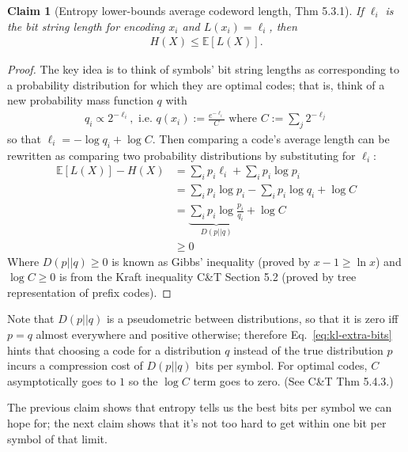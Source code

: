 \documentclass{article}
\newtheorem{claim}{Claim}
\newcommand{\E}{\mathbb{E}}
\begin{document}
    \begin{claim}[Entropy lower-bounds average codeword length, Thm 5.3.1]
         If $\ell_i$ is the bit string length for encoding $x_i$ and $L(x_i) =
         \ell_i$, then
        \begin{align}
            H(X) \leq \E[L(X)].
        \end{align}
    \end{claim}
    \begin{proof}
        The key idea is to think of symbols' bit string lengths as
        corresponding to a probability distribution for which they are optimal
        codes; that is, think of a new probability mass function $q$ with
        \begin{align}
            q_i \propto 2^{-\ell_i}, \text{~i.e.~} q(x_i) :=
            \frac{e^{-\ell_i}}{C} \text{~where~} C := \sum_j 2^{-\ell_j}
        \end{align}
        so that $\ell_i = -\log q_i + \log C$. Then comparing a code's average
        length can be rewritten as comparing two probability distributions by
        substituting for $\ell_i$:
        \begin{align}
            \E[L(X)] - H(X) &= \sum_i p_i \ell_i + \sum_i p_i \log p_i \label{eq:expected-length} \\
            &= \sum_i p_i \log p_i - \sum_i p_i \log q_i + \log C \label{eq:length-and-predictive} \\
            &= \underbrace{\sum_i p_i \log \frac{p_i}{q_i}}_{D(p || q)} +  \log C \label{eq:kl-extra-bits} \\
            &\geq 0
        \end{align}
        Where $D(p||q) \geq 0$ is known as Gibbs' inequality (proved by $x-1
        \geq \ln x$) and $\log C \geq 0$ is from the Kraft inequality
        C\&T Section 5.2 (proved by tree representation of prefix codes).
    \end{proof}

    Note that $D(p||q)$ is a pseudometric between distributions, so that it is
    zero iff $p=q$ almost everywhere and positive otherwise; therefore
    Eq.~\eqref{eq:kl-extra-bits} hints that choosing a code for a distribution
    $q$ instead of the true distribution $p$ incurs a compression cost of
    $D(p||q)$ bits per symbol. For optimal codes, $C$ asymptotically goes to
    $1$ so the $\log C$ term goes to zero. (See C\&T Thm 5.4.3.)

    The previous claim shows that entropy tells us the best bits per symbol we
    can hope for; the next claim shows that it's not too hard to get within one
    bit per symbol of that limit.
\end{document}
